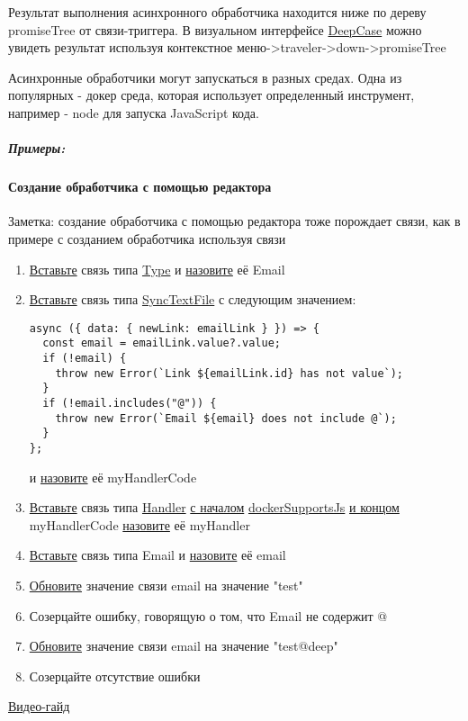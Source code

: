 \hypertarget{Handlers.Async.HowToGetResult}{}Результат выполнения асинхронного
обработчика находится ниже по дереву
promiseTree от связи-триггера. В визуальном интерфейсе
\hyperlink{DeepCase.Description}{DeepCase} можно увидеть
результат используя контекстное меню->traveler->down->promiseTree

Асинхронные обработчики могут запускаться в разных средах. Одна из популярных -
докер среда, которая использует определенный инструмент, например - node для
запуска JavaScript кода.
\subparagraph{Примеры:}
\paragraph{Создание обработчика с помощью редактора}
Заметка: создание обработчика с помощью редактора тоже порождает связи, как в примере с созданием обработчика используя связи
\begin{enumerate}
      \item \hyperlink{DeepCase.InsertLink.Description}{Вставьте} связь типа
            \hyperlink{Core.Type.Description}{Type} и
            \hyperlink{FAQ.HowToSetName}{назовите} её Email
      \item \hyperlink{DeepCase.InsertLink.Description}{Вставьте} связь типа
            \hyperlink{Core.SyncTextFile.Description}{SyncTextFile} с следующим
            значением:
            \begin{lstlisting}
async ({ data: { newLink: emailLink } }) => {
  const email = emailLink.value?.value;
  if (!email) {
    throw new Error(`Link ${emailLink.id} has not value`);
  }
  if (!email.includes("@")) {
    throw new Error(`Email ${email} does not include @`);
  }
};
                \end{lstlisting}
            и \hyperlink{FAQ.HowToSetName}{назовите} её myHandlerCode
      \item \hyperlink{DeepCase.InsertLink.Description}{Вставьте} связь типа
            \hyperlink{Core.Handler.Description}{Handler}
            \hyperlink{FAQ.HowToInsertLinkWithFromAndTo}{с началом}
            \hyperlink{Core.dockerSupportsJs.Description}{dockerSupportsJs}
            \hyperlink{FAQ.HowToInsertLinkWithFromAndTo}{и
              концом}
            myHandlerCode \hyperlink{FAQ.HowToSetName}{назовите} её myHandler
      \item \hyperlink{DeepCase.InsertLink.Description}{Вставьте} связь типа
            Email и \hyperlink{FAQ.HowToSetName}{назовите} её email
      \item \hyperlink{DeepCase.UpdateLink.Description}{Обновите} значение
            связи email на значение "test"
      \item Созерцайте ошибку, говорящую о том, что Email не содержит @
      \item \hyperlink{DeepCase.UpdateLink.Description}{Обновите} значение
            связи email на значение "test@deep"
      \item Созерцайте отсутствие ошибки
    \end{enumerate}
\href{https://youtu.be/UFKOC1GT4nE}{Видео-гайд}

